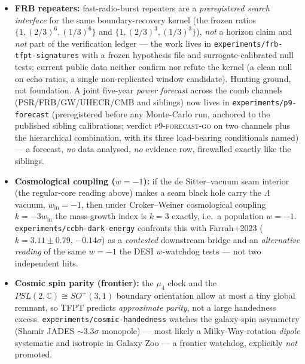 \begin{gapbox}
\begin{itemize}
$0.53$--$3.06\%$ --- in every source at or below the strength of the detected upper pair line. A
well-powered null: the ladder reading gains no support (GR resonance stays favored) but is not killed,
since the harmonic branch did not fire either (the published integer lines $92{=}184/2$, $34/68$\,Hz
stand). \texttt{experiments/hfqpo-ladder} carries the preregistered census, selection-null Monte Carlo
and the executed archival scan. A search ansatz, no prediction; even a future tooth hit would be \mC\
until the mapping is derived.
\item \textbf{FRB repeaters:} fast-radio-burst repeaters are a \emph{preregistered search interface} for
the same boundary-recovery kernel (the frozen ratios $\{1,(2/3)^6,(1/3)^6\}$ and $\{1,(2/3)^3,(1/3)^3\}$),
\emph{not} a horizon claim and \emph{not} part of the verification ledger --- the work lives in
\texttt{experiments/frb-tfpt-signatures} with a frozen hypothesis file and surrogate-calibrated null tests;
current public data neither confirm nor refute the kernel (a clean null on echo ratios, a single
non-replicated window candidate). Hunting ground, not foundation.  A joint five-year \emph{power
forecast} across the comb channels (PSR/FRB/GW/UHECR/CMB and siblings) now lives in
\texttt{experiments/p9-forecast} (preregistered before any Monte-Carlo run, anchored to the published
sibling calibrations; verdict \textsc{p9-forecast-go} on two channels plus the hierarchical
combination, with its three load-bearing conditionals named) --- a forecast, \emph{no} data analysed,
\emph{no} evidence row, firewalled exactly like the siblings.
\item \textbf{Cosmological coupling ($w=-1$):} if the de Sitter--vacuum seam interior (the regular-core
reading above) makes a seam black hole carry the $\Lambda$ vacuum, $w_{\mathrm{in}}=-1$, then under
Croker--Weiner cosmological coupling $k=-3w_{\mathrm{in}}$ the mass-growth index is $k=3$ exactly, i.e.\ a
population $w=-1$. \texttt{experiments/ccbh-dark-energy} confronts this with Farrah+2023 ($k=3.11\pm0.79$,
$-0.14\sigma$) as a \emph{contested} downstream bridge and an \emph{alternative reading} of the same $w=-1$
the DESI $w$-watchdog tests --- not two independent hits.
\item \textbf{Cosmic spin parity (frontier):} the $\mu_4$ clock and the $PSL(2,\mathbb{C})\!\cong\!SO^+(3,1)$
boundary orientation allow at most a tiny global remnant, so TFPT predicts \emph{approximate parity}, not a
large handedness excess. \texttt{experiments/cosmic-handedness} watches the galaxy-spin asymmetry
(Shamir JADES $\sim3.3\sigma$ monopole) --- most likely a Milky-Way-rotation \emph{dipole} systematic and
isotropic in Galaxy Zoo --- a frontier watchdog, explicitly \emph{not} promoted.
\end{itemize}
\end{gapbox}

